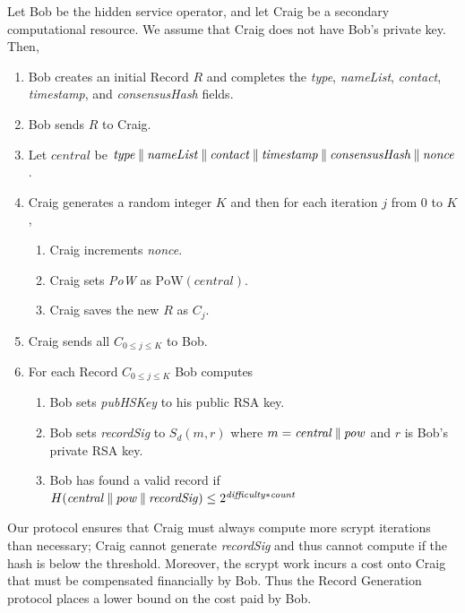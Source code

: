 Let Bob be the hidden service operator, and let Craig be a secondary computational resource. We assume that Craig does not have Bob's private key. Then,

\begin{enumerate}
	\item Bob creates an initial Record $ R $ and completes the \emph{type}, \emph{nameList}, \emph{contact}, \emph{timestamp}, and \emph{consensusHash} fields.
	\item Bob sends $ R $ to Craig.
	\item Let $ \mathit{central} $ be $\mathit{type} \mathbin{\|} \mathit{nameList} \mathbin{\|} \mathit{contact} \mathbin{\|} \mathit{timestamp} \mathbin{\|} \mathit{consensusHash} \mathbin{\|} \mathit{nonce} $.
	\item Craig generates a random integer $ K $ and then for each iteration $ j $ from 0 to $ K $,
		\begin{enumerate}
			\item Craig increments \emph{nonce}.
			\item Craig sets \emph{PoW} as $ \mathrm{PoW}(\mathit{central}) $.
			\item Craig saves the new $ R $ as $ C_{j} $.
		\end{enumerate}
	\item Craig sends all $ C_{0 \le j \le K} $ to Bob.
	\item For each Record $ C_{0 \le j \le K} $ Bob computes
		\begin{enumerate}
			\item Bob sets \emph{pubHSKey} to his public RSA key.
			\item Bob sets \emph{recordSig} to $ S_{d}(m, r) $ where $ m = \mathit{central} \mathbin{\|} \mathit{pow} $ and $ r $ is Bob's private RSA key.
			\item Bob has found a valid record if $ H(\mathit{central} \mathbin{\|} \mathit{pow} \mathbin{\|} \mathit{recordSig}) \leq 2^{\mathit{difficulty} * \mathit{count}} $
		\end{enumerate}
\end{enumerate}


Our protocol ensures that Craig must always compute more scrypt iterations than necessary; Craig cannot generate \emph{recordSig} and thus cannot compute if the hash is below the threshold. Moreover, the scrypt work incurs a cost onto Craig that must be compensated financially by Bob. Thus the Record Generation protocol places a lower bound on the cost paid by Bob.

